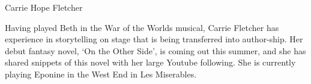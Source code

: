 {\Large Carrie Hope Fletcher}

\begin{figure}
	\vspace{-10mm}
	\vspace{-10mm}
\end{figure}

Having played Beth in the War of the Worlds musical, Carrie Fletcher has experience in storytelling on stage that is being transferred into author-ship. Her debut fantasy novel, ‘On the Other Side’, is coming out this summer, and she has shared snippets of this novel with her large Youtube following. She is currently playing Eponine in the West End in Les Miserables.